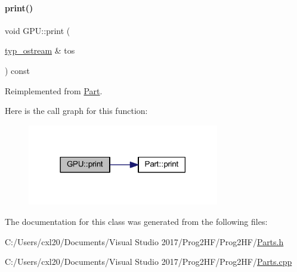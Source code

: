 \paragraph{\texorpdfstring{print()}{print()}\hspace{0.1cm}{\footnotesize\ttfamily [4/4]}}
{\footnotesize\ttfamily void G\+P\+U\+::print (\begin{DoxyParamCaption}\item[{\mbox{\hyperlink{structtyp__ostream}{typ\+\_\+ostream}} \&}]{tos }\end{DoxyParamCaption}) const\hspace{0.3cm}{\ttfamily [virtual]}}



Reimplemented from \mbox{\hyperlink{class_part_ab6396030e8b7a724731a8b54bd4942fc}{Part}}.

Here is the call graph for this function\+:
\nopagebreak
\begin{figure}[H]
\begin{center}
\leavevmode
\includegraphics[width=237pt]{class_g_p_u_ad54f6d21007e216f27dc738aea2de836_cgraph}
\end{center}
\end{figure}


The documentation for this class was generated from the following files\+:\begin{DoxyCompactItemize}
\item 
C\+:/\+Users/cxl20/\+Documents/\+Visual Studio 2017/\+Prog2\+H\+F/\+Prog2\+H\+F/\mbox{\hyperlink{_parts_8h}{Parts.\+h}}\item 
C\+:/\+Users/cxl20/\+Documents/\+Visual Studio 2017/\+Prog2\+H\+F/\+Prog2\+H\+F/\mbox{\hyperlink{_parts_8cpp}{Parts.\+cpp}}\end{DoxyCompactItemize}
